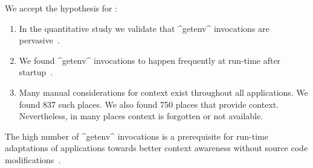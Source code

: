 \begin{finding}
We accept the hypothesis for :
\fixtheorem
\begin{enumerate}
\item
In the quantitative study we validate that ^getenv^ invocations are pervasive~\cite{raab2016unanticipated}.

\item
We found ^getenv^ invocations to happen frequently at run-time after startup~\cite{raab2016unanticipated}.

\item
Many manual considerations for context exist throughout all applications.
We found 837 such places.
We also found 750 places that provide context.
Nevertheless, in many places context is forgotten or not available.
\end{enumerate}

\begin{implication}
The high number of ^getenv^ invocations is a prerequisite for run-time adaptations of applications towards better context awareness without source code modifications~\cite{raab2016unanticipated}.
\end{implication}
\end{finding}


































































